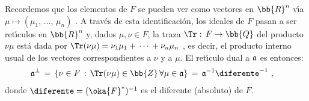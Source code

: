 \begin{obsReticuloDual}
	Recordemos que los elementos de $F$ se pueden ver como
	vectores en $\bb{R}^{n}$ v\'{\i}a
	\begin{math}
		\mu\mapsto(\mu_{1},\,\dots,\,\mu_{n})
	\end{math} .
	A trav\'{e}s de esta identificaci\'{o}n, los ideales de $F$ pasan
	a ser ret\'{\i}culos en $\bb{R}^{n}$ y, dados $\mu,\nu\in F$, la
	traza $\Tr:\,F\rightarrow\bb{Q}$ del producto $\nu\mu$ est\'{a}
	dada por
	\begin{math}
		\Tr(\nu\mu)=\nu_{1}\mu_{1}+\,\cdots\,+\nu_{n}\mu_{n}
	\end{math} ,
	es decir, el producto interno usual de los vectores correspondientes
	a $\nu$ y a $\mu$. El ret\'{\i}culo dual a $\frak{a}$ es entonces:
	\begin{align*}
		\frak{a}^{\perp} & \,=\,
			\left\lbrace \nu\in F\,:\,\Tr(\nu\mu)\in\bb{Z}\,
			\forall\mu\in\frak{a}\right\rbrace
			\,=\,\frak{a}^{-1}\diferente^{-1}
		\text{ ,}
	\end{align*}
	donde $\diferente=(\oka{F}^{*})^{-1}$ es el diferente (absoluto)
	de $F$.
\end{obsReticuloDual}

